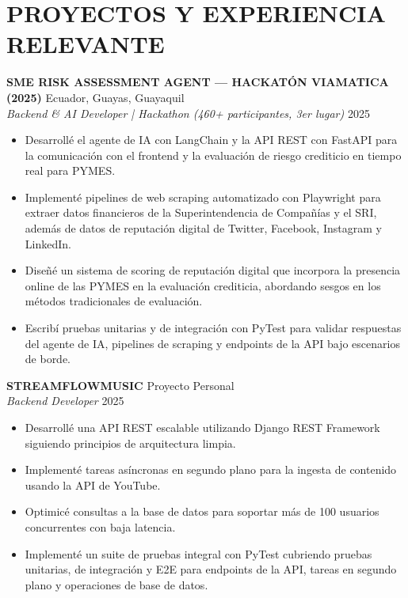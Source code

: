 \documentclass[11pt, a4paper]{article}
\begin{document}
\vspace{4pt}

\section*{PROYECTOS Y EXPERIENCIA RELEVANTE}

\textbf{SME RISK ASSESSMENT AGENT --- HACKATÓN VIAMATICA (2025)} \hfill Ecuador, Guayas, Guayaquil \\
\textit{Backend \& AI Developer | Hackathon (460+ participantes, 3er lugar)} \hfill 2025

\begin{itemize}
\item Desarrollé el agente de IA con LangChain y la API REST con FastAPI para la comunicación con el frontend y la evaluación de riesgo crediticio en tiempo real para PYMES.
\item Implementé pipelines de web scraping automatizado con Playwright para extraer datos financieros de la Superintendencia de Compañías y el SRI, además de datos de reputación digital de Twitter, Facebook, Instagram y LinkedIn.
\item Diseñé un sistema de scoring de reputación digital que incorpora la presencia online de las PYMES en la evaluación crediticia, abordando sesgos en los métodos tradicionales de evaluación.
\item Escribí pruebas unitarias y de integración con PyTest para validar respuestas del agente de IA, pipelines de scraping y endpoints de la API bajo escenarios de borde.
\end{itemize}

\vspace{4pt}

\textbf{STREAMFLOWMUSIC} \hfill Proyecto Personal \\
\textit{Backend Developer} \hfill 2025

\begin{itemize}
\item Desarrollé una API REST escalable utilizando Django REST Framework siguiendo principios de arquitectura limpia.
\item Implementé tareas asíncronas en segundo plano para la ingesta de contenido usando la API de YouTube.
\item Optimicé consultas a la base de datos para soportar más de 100 usuarios concurrentes con baja latencia.
\item Implementé un suite de pruebas integral con PyTest cubriendo pruebas unitarias, de integración y E2E para endpoints de la API, tareas en segundo plano y operaciones de base de datos.
\end{itemize}
\end{document}
